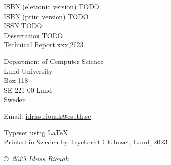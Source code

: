 \documentclass[a4paper, 10pt, twoside, openright]{book}
\begin{document}
\frontmatter

\begin{titlepage}

\thispagestyle{empty}


\begin{flushleft}


ISBN (eletronic version) TODO\\
ISBN (print version) TODO\\
ISSN TODO\\
Dissertation TODO\\
Technical Report xxx,2023\linebreak[2]

Department of Computer Science \\
Lund University \\
Box 118 \\
SE-221 00  Lund \\
Sweden  \linebreak[2]

Email: \url{idriss.riouak@cs.lth.se} \linebreak[2]

Typeset using \LaTeX \\

Printed in Sweden by Tryckeriet i E-huset, Lund, 2023\linebreak[2]

\textit{\copyright ~2023 Idriss Riouak}
\vspace{10mm}
\end{flushleft}
\end{titlepage}










\setcounter{tocdepth}{3}
\tableofcontents

\mainmatter
\renewcommand{\thesection}{\arabic{section}}
\renewcommand{\thefigure}{\arabic{figure}}
\renewcommand{\thetable}{\arabic{table}}
\renewcommand{\thechapter}{\Roman{chapter}}
\renewcommand{\theequation}{\arabic{equation}}
\end{document}
